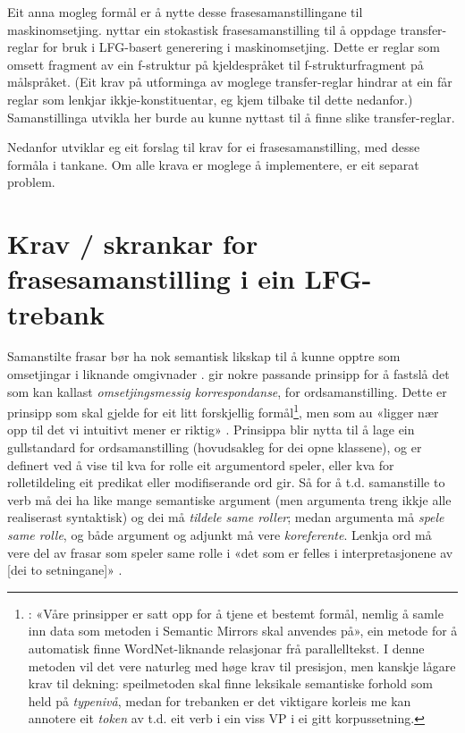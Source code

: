 \documentclass[11pt,a4paper,oneside,draft]{book}
\begin{document}
Eit anna mogleg formål er å nytte desse frasesamanstillingane til
maskinomsetjing. \citet{riezler2006gmt} nyttar ein stokastisk
frasesamanstilling til å oppdage transfer-reglar for bruk i LFG-basert
generering i maskinomsetjing. Dette er reglar som omsett fragment av
ein f-struktur på kjeldespråket til f-strukturfragment på
målspråket. (Eit krav på utforminga av moglege transfer-reglar hindrar
at ein får reglar som lenkjar ikkje-konstituentar, eg kjem tilbake til
dette nedanfor.)  Samanstillinga utvikla her burde au kunne nyttast
til å finne slike transfer-reglar.

Nedanfor utviklar eg eit forslag til krav for ei frasesamanstilling,
med desse formåla i tankane. Om alle krava er moglege å implementere,
er eit separat problem.

\section{Krav / skrankar for frasesamanstilling i ein LFG-trebank}
\label{sec-3.3}


Samanstilte frasar bør ha nok semantisk likskap til å kunne opptre som
omsetjingar i liknande omgivnader
\citep[s.~74]{dyvik2009lmp}. \citet{thunes2003eal} gir nokre passande prinsipp
for å fastslå det som kan kallast \emph{omsetjingsmessig korrespondanse}, for
ordsamanstilling. Dette er prinsipp som skal gjelde for eit litt forskjellig
formål\footnote{\cite[s.~2]{thunes2003eal}: «Våre prinsipper er satt
opp for å tjene et bestemt formål, nemlig å samle inn data som metoden
i Semantic Mirrors skal anvendes på», ein metode for å automatisk
finne WordNet-liknande relasjonar frå parallelltekst. I denne metoden
vil det vere naturleg med høge krav til presisjon, men kanskje lågare
krav til dekning: speilmetoden skal finne leksikale semantiske forhold
som held på \emph{typenivå}, medan for trebanken er det viktigare korleis
me kan annotere eit \emph{token} av t.d. eit verb i ein viss VP i ei gitt
korpussetning. }, men som au «ligger nær opp til det vi intuitivt
mener er riktig» \citep[s.~2]{thunes2003eal}. Prinsippa blir nytta til
å lage ein gullstandard for ordsamanstilling (hovudsakleg for dei opne
klassene), og er definert ved å vise til kva for rolle eit argumentord
speler, eller kva for rolletildeling eit predikat eller modifiserande
ord gir. Så for å t.d. samanstille to verb må dei ha like mange
semantiske argument (men argumenta treng ikkje alle realiserast
syntaktisk) og dei må \emph{tildele same roller}; medan argumenta må \emph{spele same rolle}, og både argument og adjunkt må vere \emph{koreferente}. Lenkja
ord må vere del av frasar som speler same rolle i «det som er felles i
interpretasjonene av [dei to setningane]» \citep[s.~3]{thunes2003eal}.
\end{document}
